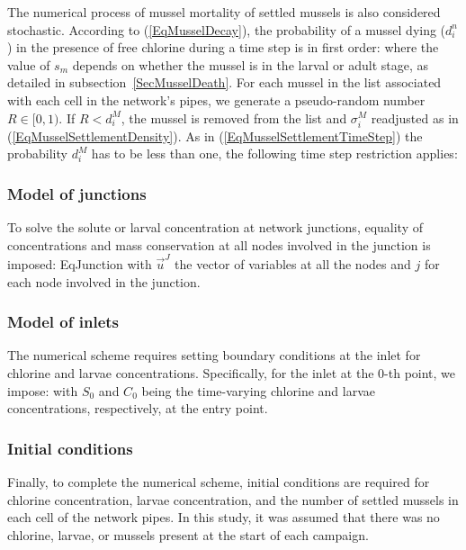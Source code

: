 \documentclass[review,authoryear]{elsarticle}
\begin{document}
The numerical process of mussel mortality of settled mussels is also considered
stochastic. According to (\ref{EqMusselDecay}), the probability of a mussel
dying ($d_i^n$) in the presence of free chlorine during a time step is in first
order:
where the value of $s_m$ depends on whether the mussel is in the larval or
adult stage, as detailed in subsection~\ref{SecMusselDeath}. For each mussel in
the list associated with each cell in the network's pipes, we generate a
pseudo-random number $R\in[0,1)$. If $R<d_i^M$, the mussel is removed from the
list and $\sigma_i^M$ readjusted as in (\ref{EqMusselSettlementDensity}). As in
(\ref{EqMusselSettlementTimeStep}) the probability $d_i^M$ has to be less than
one, the following time step restriction applies:

\subsubsection{Model of junctions}

To solve the solute or larval concentration at network junctions, equality of
concentrations and mass conservation at all nodes involved in the junction is
imposed:
{EqJunction}
with $\vec{u}^J$ the vector of variables at all the nodes and $j$ for each node
involved in the junction.

\subsubsection{Model of inlets}

The numerical scheme requires setting boundary conditions at the inlet for
chlorine and larvae concentrations. Specifically, for the inlet at the 0-th
point, we impose:
with $S_0$ and $C_0$ being the time-varying chlorine and larvae concentrations,
respectively, at the entry point.

\subsubsection{Initial conditions \label{SecInitialConditions}}

Finally, to complete the numerical scheme, initial conditions are required for
chlorine concentration, larvae concentration, and the number of settled mussels
in each cell of the network pipes. In this study, it was assumed that there was
no chlorine, larvae, or mussels present at the start of each campaign.
\end{document}
